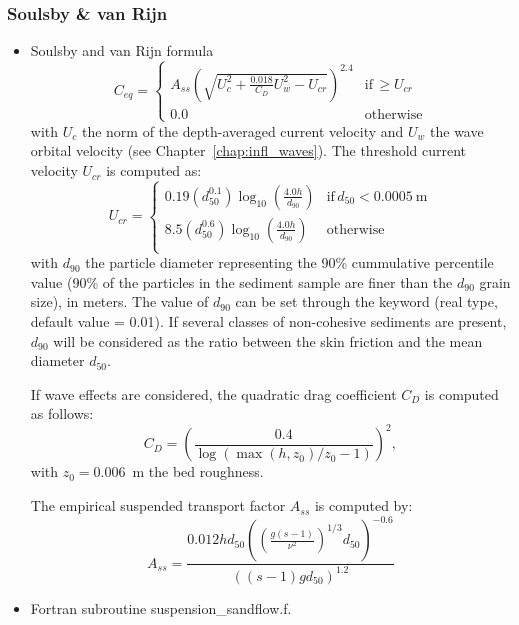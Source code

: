 \subsubsection{Soulsby \& van Rijn}
\begin{itemize}
\item Soulsby and van Rijn formula~\cite{Soulsby97} 
  \begin{equation*}
C_{eq}=\left\{\begin{array}{ll}
A_{ss}\left(\sqrt{U_c^2+\frac{0.018}{C_D}U_w^2-U_{cr}}\right)^{2.4} & \text{if}\, \geq U_{cr}\\
0.0 &  \text{otherwise}
\end{array}
\right.
\end{equation*}
  with $U_c$ the norm of the depth-averaged current velocity and $U_w$ the wave orbital velocity (see Chapter~\ref{chap:infl_waves}). The threshold current velocity $U_{cr}$ is computed as:
\begin{equation*}
U_{cr}=\left\{\begin{array}{ll}
  0.19 (d_{50}^{0.1})\log_{10}\left(\frac{4.0 h}{d_{90}}\right) & \text{if}\, d_{50} < 0.0005~\text{m}\\
  8.5 (d_{50}^{0.6})\log_{10}\left(\frac{4.0 h}{d_{90}}\right) & \text{otherwise}\\
\end{array}
\right.
\end{equation*}
with $d_{90}$ the particle diameter representing the 90\% cummulative percentile value (90\% of the particles in the sediment sample are finer than the $d_{90}$ grain size), in meters.
The value of $d_{90}$ can be set through the keyword 
(real type, default value {\ttfamily = 0.01}). If several classes of
non-cohesive sediments are present, $d_{90}$ will be considered as the ratio
between the skin friction and the mean diameter $d_{50}$.

If wave effects are considered, the quadratic drag coefficient $C_D$ is computed as follows:
\begin{equation*}
  C_D = \left(\frac{0.4}{\log(\max(h, z_{0})/z_{0}-1)}\right)^{2},
\end{equation*}
with $z_{0}=0.006$~m the bed roughness.

The empirical suspended transport factor $A_{ss}$ is computed by:
\begin{equation*}
A_{ss} = \frac{0.012 h d_{50} \left(\left(\frac{g(s-1)}{\nu^2}\right)^{1/3}d_{50}\right)^{-0.6}}{\left((s-1)g d_{50}\right)^{1.2}}
\end{equation*}
\item Fortran subroutine {\ttfamily suspension\_sandflow.f}.
\end{itemize}

